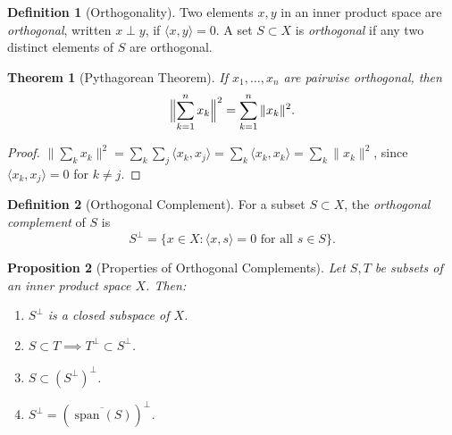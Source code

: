 \documentclass[11pt,a4paper]{article}
\theoremstyle{definition}
\newtheorem{definition}{Definition}[section]
\theoremstyle{plain}
\newtheorem{theorem}{Theorem}[section]
\newtheorem{proposition}[theorem]{Proposition}
\theoremstyle{remark}
\DeclareMathOperator{\spn}{span}
\begin{document}
\begin{definition}[Orthogonality]\label{def:orthogonality}
Two elements $x, y$ in an inner product space are \emph{orthogonal}, written
$x \perp y$, if $\langle x, y \rangle = 0$. A set $S \subset X$ is
\emph{orthogonal} if any two distinct elements of $S$ are orthogonal.
\end{definition}

\begin{theorem}[Pythagorean Theorem]\label{thm:pythagorean}
If $x_1, \ldots, x_n$ are pairwise orthogonal, then
\[
    \Bigl\|\sum_{k=1}^n x_k\Bigr\|^2 = \sum_{k=1}^n \|x_k\|^2.
\]
\end{theorem}

\begin{proof}
$\bigl\|\sum_k x_k\bigr\|^2 = \sum_k \sum_j \langle x_k, x_j \rangle
= \sum_k \langle x_k, x_k \rangle = \sum_k \|x_k\|^2$,
since $\langle x_k, x_j \rangle = 0$ for $k \neq j$.
\end{proof}

\begin{definition}[Orthogonal Complement]\label{def:orthogonal-complement}
For a subset $S \subset X$, the \emph{orthogonal complement} of $S$ is
\[
    S^\perp = \{x \in X : \langle x, s \rangle = 0 \text{ for all } s \in S\}.
\]
\end{definition}

\begin{proposition}[Properties of Orthogonal Complements]\label{prop:orth-complement}
Let $S, T$ be subsets of an inner product space $X$. Then:
\begin{enumerate}[label=(\roman*)]
    \item $S^\perp$ is a closed subspace of $X$.
    \item $S \subset T \implies T^\perp \subset S^\perp$.
    \item $S \subset (S^\perp)^\perp$.
    \item $S^\perp = (\overline{\spn(S)})^\perp$.
\end{enumerate}
\end{proposition}
\end{document}
